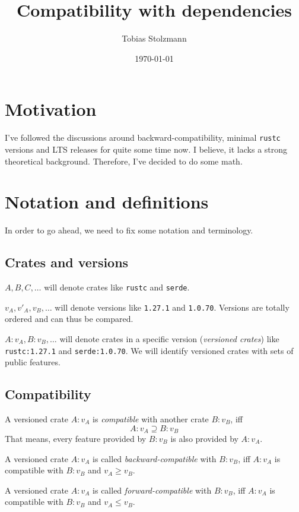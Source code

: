 \documentclass{article}
\title{Compatibility with dependencies}
\author{Tobias Stolzmann}
\date{\today}
\begin{document}
    \maketitle

    \section{Motivation}
    I've followed the discussions around backward-compatibility, minimal \texttt{rustc} versions and LTS releases for quite some time now. I believe, it lacks a strong theoretical background. Therefore, I've decided to do some math.

    \section{Notation and definitions}
    In order to go ahead, we need to fix some notation and terminology.

    \subsection{Crates and versions}
    $A, B, C, \ldots$ will denote crates like \texttt{rustc} and \texttt{serde}.

    $v_A, v'_A, v_B, \ldots$ will denote versions like \texttt{1.27.1} and \texttt{1.0.70}. Versions are totally ordered and can thus be compared.

    $A:v_A, B:v_B, \ldots$ will denote crates in a specific version (\emph{versioned crates}) like \texttt{rustc:1.27.1} and \texttt{serde:1.0.70}. We will identify versioned crates with sets of public features.

    \subsection{Compatibility}
    A versioned crate $A:v_A$ is \emph{compatible} with another crate $B:v_B$, iff
    \begin{equation}
    A:v_A \supseteq B:v_B
    \end{equation}
    That means, every feature provided by $B:v_B$ is also provided by $A:v_A$.

    A versioned crate $A:v_A$ is called \emph{backward-compatible} with $B:v_B$, iff $A:v_A$ is compatible with $B:v_B$ and $v_A \geq v_B$.

    A versioned crate $A:v_A$ is called \emph{forward-compatible} with $B:v_B$, iff $A:v_A$ is compatible with $B:v_B$ and $v_A \leq v_B$.
\end{document}
